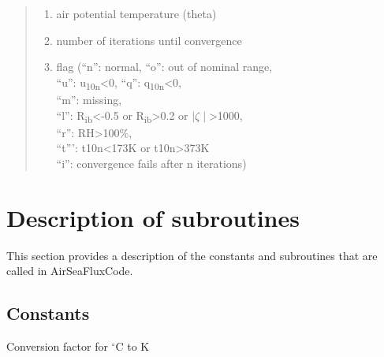 \documentclass[letterpaper,10pt,english]{sphinxmanual}
\begin{document}
\begin{fulllineitems}
\begin{quote}
\begin{description}
\begin{itemize}
\begin{enumerate}
\item {} 
air potential temperature (theta)

\item {} 
number of iterations until convergence

\item {} 
flag (``n'': normal, ``o'': out of nominal range,\\
        ``u'': u\textsubscript{10n}<0, ``q'': q\textsubscript{10n}<0, \\
        ``m'': missing, \\
        ``l'': R\textsubscript{ib}<-0.5 or R\textsubscript{ib}>0.2 or $\mid\zeta\mid$>1000,\\
        ``r'':  RH>100\%, \\
        ``t''': t10n<173K or t10n>373K \\
        ``i'': convergence fails after n iterations)

\end{enumerate}
\end{itemize}


\end{description}\end{quote}
\end{fulllineitems}



\section{Description of subroutines}
\label{\detokenize{index:description-of-subroutines}}
This section provides a description of the constants and subroutines that are called in AirSeaFluxCode.

\subsection{Constants}
\label{\detokenize{index:constants-in-util_subs}}

\label{\detokenize{index:module-util_subs}}

\begin{fulllineitems}
\label{\detokenize{index:util_subs.CtoK}}
Conversion factor for $^\circ$C to K

\end{fulllineitems}
\end{document}
